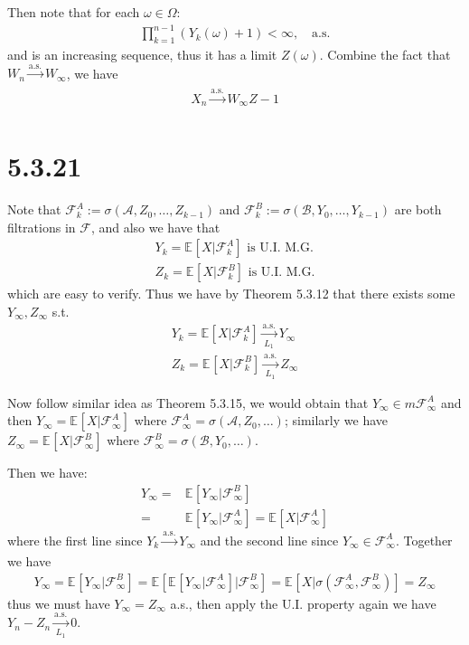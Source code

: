 \documentclass[11pt,a4paper]{ctexart}
\numberwithin{equation}{section}%
\newcommand{\F}{\mathcal{F}}
\begin{document}
Then note that for each $ \omega \in \Omega $: 
\begin{align*}
    \prod_{k=1}^{n-1}(Y_k(\omega )+1) <\infty,\quad \text{a.s.}
\end{align*}
and is an increasing sequence, thus it has a limit $ Z(\omega ) $. Combine the fact that $ W_n \xrightarrow[]{\mathrm{a.s.}} W_\infty $, we have
\begin{align*}
    X_n \xrightarrow[]{\mathrm{a.s.}}  W_\infty Z -1
\end{align*}




\section{5.3.21}

Note that $ \F^A_k:=\sigma (\mathcal{A},Z_0,\ldots,Z_{k-1}) $ and $ \F^B_k:=\sigma (\mathcal{B},Y_0,\ldots,Y_{k-1}) $ are both filtrations in $ \F $, and also we have that
\begin{align*}
    Y_k = \mathbb{E}_{  }\left[ X| \F^A_k \right]\text{ is U.I. M.G.}\\
    Z_k = \mathbb{E}_{  }\left[ X| \F^B_k \right]\text{ is U.I. M.G.}  
\end{align*}
which are easy to verify. Thus we have by Theorem 5.3.12 that there exists some $ Y_\infty, Z_\infty $ s.t.
\begin{align*}
    Y_k = \mathbb{E}_{  }\left[ X| \F^A_k \right] \xrightarrow[L_1]{\mathrm{a.s.}} Y_\infty\\ 
    Z_k = \mathbb{E}_{  }\left[ X| \F^B_k \right] \xrightarrow[L_1]{\mathrm{a.s.}} Z_\infty
\end{align*}

Now follow similar idea as Theorem 5.3.15, we would obtain that $ Y_\infty \in m\F^A_\infty $ and then $ Y_\infty = \mathbb{E}_{  }\left[ X|\F^A_\infty \right]  $ where $ \F^A_\infty = \sigma (\mathcal{A}, Z_0,\ldots) $; similarly we have $ Z_\infty = \mathbb{E}_{  }\left[ X|\F^B_\infty \right]  $ where $ \F^B_\infty = \sigma (\mathcal{B}, Y_0,\ldots) $.

Then we have:
\begin{align*}
    Y_\infty = &\mathbb{E}_{  }\left[ Y_\infty | \F_{\infty}^B \right]\\
    =& \mathbb{E}_{  }\left[ Y_\infty | \F_{\infty}^A\right] = \mathbb{E}_{  }\left[ X|\F_\infty^A \right] 
\end{align*}
where the first line since $ Y_k\xrightarrow[]{\mathrm{a.s.}} Y_\infty $ and the second line since $ Y_\infty \in \F^A_\infty $. Together we have
\begin{align*}
     Y_\infty = \mathbb{E}_{  }\left[ Y_\infty | \F_{\infty}^B \right] = \mathbb{E}_{  }\left[ \mathbb{E}_{  }\left[ Y_\infty | \F_\infty ^A \right] |\F_\infty ^B \right] = \mathbb{E}_{  }\left[ X| \sigma (\F_\infty^A,\F_\infty^B) \right] = Z_\infty
\end{align*}
thus we must have $ Y_\infty = Z_\infty $ a.s., then apply the U.I. property again we have $ Y_n-Z_n \xrightarrow[L_1]{\mathrm{a.s.}} 0 $.
\end{document}
